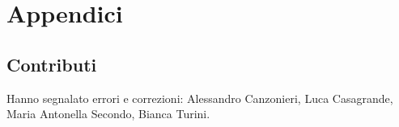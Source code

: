\documentclass[italian,a4paper,oneside,headinclude]{scrbook}
\begin{document}
\backmatter
\chapter{Appendici}


\section{Contributi}

Hanno segnalato errori e correzioni:
Alessandro Canzonieri,
Luca Casagrande,
Maria Antonella Secondo,
Bianca Turini.
% 
% 

\printindex
\end{document}
